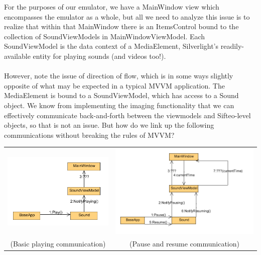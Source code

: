 \documentclass[12pt]{article}
\begin{document}
For the purposes of our emulator, we have a MainWindow view which encompasses the emulator as a whole, but all we need to analyze this issue is to realize that within that MainWindow there is an ItemsControl bound to the collection of SoundViewModels in MainWindowViewModel. Each SoundViewModel is the data context of a MediaElement, Silverlight’s readily-available entity for playing sounds (and videos too!). \\\\
However, note the issue of direction of flow, which is in some ways slightly opposite of what may be expected in a typical MVVM application. The MediaElement is bound to a SoundViewModel, which has access to a Sound object. We know from implementing the imaging functionality that we can effectively communicate back-and-forth between the viewmodels and Sifteo-level objects, so that is not an issue. But how do we link up the following communications without breaking the rules of MVVM?
\begin{center}
\begin{tabular}{c | c}
\includegraphics[scale=.45]{basicCommunication.png}	&
\includegraphics[scale=.45]{pauseAndResume.png} \\
(Basic playing communication) &
(Pause and resume communication)
\end{tabular}
\end{center}
\end{document}

